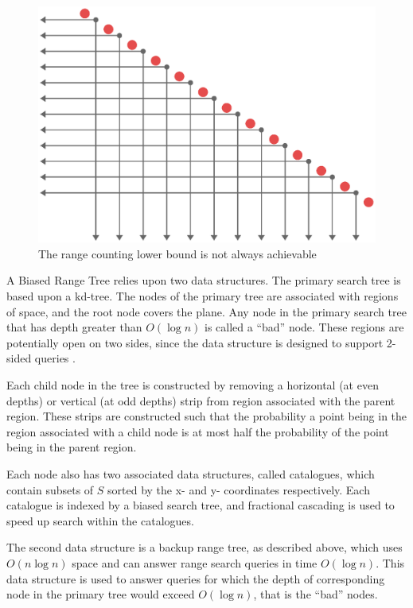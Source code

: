 \documentclass[mcs]{scsthesis}
\begin{document}
\begin{figure}
\begin{center}
\includegraphics[scale=0.6]{diagrams/range_counting.eps}
\caption{The range counting lower bound is not always achievable}
\label{fig:rangelb}
\end{center}
\end{figure}

A Biased Range Tree relies upon two data structures. The primary search tree
is based upon a kd-tree. The nodes of the primary tree are associated with
regions of space, and the root node covers the plane. Any node in the primary
search tree that has depth greater than \(O(\log n)\) is called a ``bad'' node.
These regions are potentially open on two sides, since the data structure is
designed to support 2-sided queries \cite{biasedrange}. 

Each child node in the tree is constructed by removing a horizontal (at even
depths) or vertical (at odd depths) strip from region associated with the
parent region. These strips are constructed such that the probability a point
being in the region associated with a child node is at most half the probability
of the point being in the parent region.

Each node also has two associated data structures, called catalogues, which
contain subsets of \(S\) sorted by the x- and y- coordinates respectively.
Each catalogue is indexed by a biased search tree, and fractional cascading is
used to speed up search within the catalogues.

The second data structure is a backup range tree, as described above, which
uses \(O(n \log n)\) space and can answer range search queries in time
\(O(\log n)\). This data structure is used to answer queries for which the
depth of corresponding node in the primary tree would exceed \(O(\log n)\),
that is the ``bad'' nodes.
\end{document}
